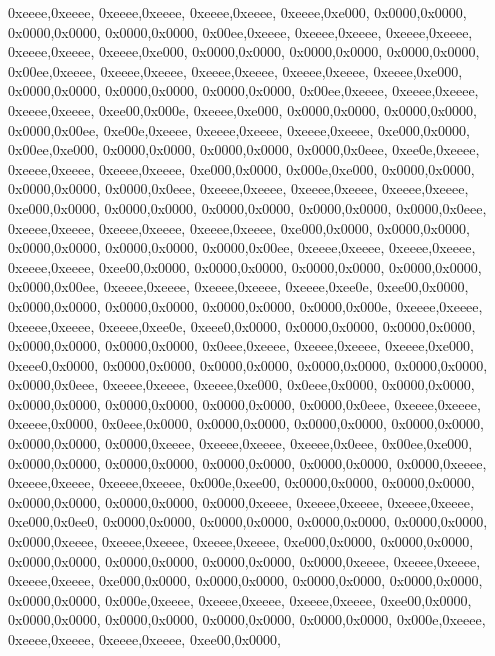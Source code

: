 {	0xeeee,0xeeee,
	0xeeee,0xeeee,
	0xeeee,0xeeee,
	0xeeee,0xe000,
	0x0000,0x0000,
	0x0000,0x0000,
	0x0000,0x0000,
	0x00ee,0xeeee,
	0xeeee,0xeeee,
	0xeeee,0xeeee,
	0xeeee,0xeeee,
	0xeeee,0xe000,
	0x0000,0x0000,
	0x0000,0x0000,
	0x0000,0x0000,
	0x00ee,0xeeee,
	0xeeee,0xeeee,
	0xeeee,0xeeee,
	0xeeee,0xeeee,
	0xeeee,0xe000,
	0x0000,0x0000,
	0x0000,0x0000,
	0x0000,0x0000,
	0x00ee,0xeeee,
	0xeeee,0xeeee,
	0xeeee,0xeeee,
	0xee00,0x000e,
	0xeeee,0xe000,
	0x0000,0x0000,
	0x0000,0x0000,
	0x0000,0x00ee,
	0xe00e,0xeeee,
	0xeeee,0xeeee,
	0xeeee,0xeeee,
	0xe000,0x0000,
	0x00ee,0xe000,
	0x0000,0x0000,
	0x0000,0x0000,
	0x0000,0x0eee,
	0xee0e,0xeeee,
	0xeeee,0xeeee,
	0xeeee,0xeeee,
	0xe000,0x0000,
	0x000e,0xe000,
	0x0000,0x0000,
	0x0000,0x0000,
	0x0000,0x0eee,
	0xeeee,0xeeee,
	0xeeee,0xeeee,
	0xeeee,0xeeee,
	0xe000,0x0000,
	0x0000,0x0000,
	0x0000,0x0000,
	0x0000,0x0000,
	0x0000,0x0eee,
	0xeeee,0xeeee,
	0xeeee,0xeeee,
	0xeeee,0xeeee,
	0xe000,0x0000,
	0x0000,0x0000,
	0x0000,0x0000,
	0x0000,0x0000,
	0x0000,0x00ee,
	0xeeee,0xeeee,
	0xeeee,0xeeee,
	0xeeee,0xeeee,
	0xee00,0x0000,
	0x0000,0x0000,
	0x0000,0x0000,
	0x0000,0x0000,
	0x0000,0x00ee,
	0xeeee,0xeeee,
	0xeeee,0xeeee,
	0xeeee,0xee0e,
	0xee00,0x0000,
	0x0000,0x0000,
	0x0000,0x0000,
	0x0000,0x0000,
	0x0000,0x000e,
	0xeeee,0xeeee,
	0xeeee,0xeeee,
	0xeeee,0xee0e,
	0xeee0,0x0000,
	0x0000,0x0000,
	0x0000,0x0000,
	0x0000,0x0000,
	0x0000,0x0000,
	0x0eee,0xeeee,
	0xeeee,0xeeee,
	0xeeee,0xe000,
	0xeee0,0x0000,
	0x0000,0x0000,
	0x0000,0x0000,
	0x0000,0x0000,
	0x0000,0x0000,
	0x0000,0x0eee,
	0xeeee,0xeeee,
	0xeeee,0xe000,
	0x0eee,0x0000,
	0x0000,0x0000,
	0x0000,0x0000,
	0x0000,0x0000,
	0x0000,0x0000,
	0x0000,0x0eee,
	0xeeee,0xeeee,
	0xeeee,0x0000,
	0x0eee,0x0000,
	0x0000,0x0000,
	0x0000,0x0000,
	0x0000,0x0000,
	0x0000,0x0000,
	0x0000,0xeeee,
	0xeeee,0xeeee,
	0xeeee,0x0eee,
	0x00ee,0xe000,
	0x0000,0x0000,
	0x0000,0x0000,
	0x0000,0x0000,
	0x0000,0x0000,
	0x0000,0xeeee,
	0xeeee,0xeeee,
	0xeeee,0xeeee,
	0x000e,0xee00,
	0x0000,0x0000,
	0x0000,0x0000,
	0x0000,0x0000,
	0x0000,0x0000,
	0x0000,0xeeee,
	0xeeee,0xeeee,
	0xeeee,0xeeee,
	0xe000,0x0ee0,
	0x0000,0x0000,
	0x0000,0x0000,
	0x0000,0x0000,
	0x0000,0x0000,
	0x0000,0xeeee,
	0xeeee,0xeeee,
	0xeeee,0xeeee,
	0xe000,0x0000,
	0x0000,0x0000,
	0x0000,0x0000,
	0x0000,0x0000,
	0x0000,0x0000,
	0x0000,0xeeee,
	0xeeee,0xeeee,
	0xeeee,0xeeee,
	0xe000,0x0000,
	0x0000,0x0000,
	0x0000,0x0000,
	0x0000,0x0000,
	0x0000,0x0000,
	0x000e,0xeeee,
	0xeeee,0xeeee,
	0xeeee,0xeeee,
	0xee00,0x0000,
	0x0000,0x0000,
	0x0000,0x0000,
	0x0000,0x0000,
	0x0000,0x0000,
	0x000e,0xeeee,
	0xeeee,0xeeee,
	0xeeee,0xeeee,
	0xee00,0x0000,
}
